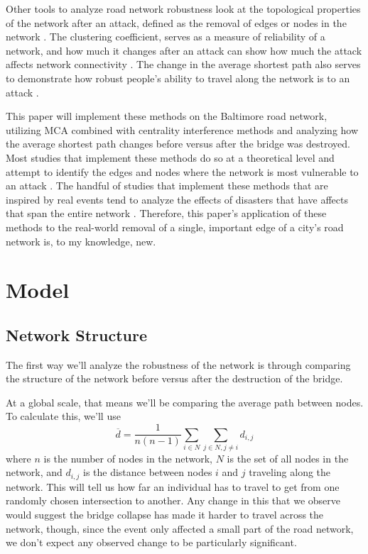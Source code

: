 \documentclass[11pt]{article}
\numberwithin{equation}{section} %
\numberwithin{figure}{section} %
\numberwithin{table}{section} %
\theoremstyle{definition}
\begin{document}
Other tools to analyze road network robustness look at the topological properties of the network after an attack, defined as the removal of edges or nodes in the network \parencite{Holme02}. The clustering coefficient, serves as a measure of reliability of a network, and how much it changes after an attack can show how much the attack affects network connectivity \parencite{Xeumei10}. The change in the average shortest path also serves to demonstrate how robust people's ability to travel along the network is to an attack \parencites{Xeumei10}{Kaub24}.

This paper will implement these methods on the Baltimore road network, utilizing MCA combined with centrality interference methods and analyzing how the average shortest path changes before versus after the bridge was destroyed. Most studies that implement these methods do so at a theoretical level and attempt to identify the edges and nodes where the network is most vulnerable to an attack \parencites{Xeumei10}{Ando21}{Masuccia16}{Julliard15}{Holme02}. The handful of studies that implement these methods that are inspired by real events tend to analyze the effects of disasters that have affects that span the entire network \parencites{Kaub24}{Sakakibara04}. Therefore, this paper's application of these methods to the real-world removal of a single, important edge of a city's road network is, to my knowledge, new.


\section{Model} \label{sec:model}

\subsection{Network Structure}

The first way we'll analyze the robustness of the network is through comparing the structure of the network before versus after the destruction of the bridge.

At a global scale, that means we'll be comparing the average path between nodes. To calculate this, we'll use
\[
  \overline{d} = \frac{1}{n(n-1)} \sum_{i \in N} \sum_{j \in N, j \neq i} d_{i, j}
\]
where $n$ is the number of nodes in the network, $N$ is the set of all nodes in the network, and $d_{i, j}$ is the distance between nodes $i$ and $j$ traveling along the network. This will tell us how far an individual has to travel to get from one randomly chosen intersection to another. Any change in this that we observe would suggest the bridge collapse has made it harder to travel across the network, though, since the event only affected a small part of the road network, we don't expect any observed change to be particularly significant.
\end{document}
